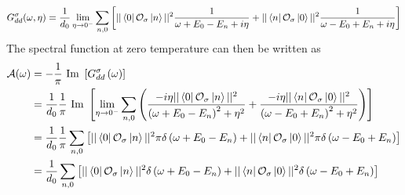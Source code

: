 \documentclass[reprint,hidelinks]{revtex4-2}
\begin{document}
\begin{widetext}
\begin{equation}\begin{aligned}
	G_{d d}^\sigma(\omega, \eta) = \frac{1}{d_0}\lim_{\eta \to 0^-}\sum_{n,0}\left[||\bra{0}\mathcal{O}_{\sigma}\ket{n}||^2\frac{1}{\omega + E_0 - E_n + i\eta} + ||\bra{n}\mathcal{O}_{\sigma}\ket{0}||^2\frac{1}{\omega - E_0 + E_n + i\eta}\right]\\
\end{aligned}\end{equation}
The spectral function at zero temperature can then be written as
\begin{equation}\begin{aligned}
	\mathcal{A(\omega)} &= -\frac{1}{\pi}\text{ Im }\left[G_{dd}^\sigma\left( \omega \right) \right] \\
			    &= \frac{1}{d_0}\frac{1}{\pi}\text{ Im }\left[\lim_{\eta \to 0^-}\sum_{n,0}\left(\frac{-i\eta ||\bra{0}\mathcal{O}_{\sigma}\ket{n}||^2}{\left(\omega + E_0 - E_n\right)^2 + \eta^2} + \frac{-i\eta ||\bra{n}\mathcal{O}_{\sigma}\ket{0}||^2}{\left(\omega - E_0 + E_n\right)^2 + \eta^2}\right)\right]\\
			    &= \frac{1}{d_0}\frac{1}{\pi}\sum_{n,0}\left[||\bra{0}\mathcal{O}_{\sigma}\ket{n}||^2\pi\delta\left(\omega + E_0 - E_n\right) + ||\bra{n}\mathcal{O}_{\sigma}\ket{0}||^2\pi\delta\left(\omega - E_0 + E_n\right)\right]\\
			    &= \frac{1}{d_0}\sum_{n,0}\left[||\bra{0}\mathcal{O}_{\sigma}\ket{n}||^2\delta\left(\omega + E_0 - E_n\right) + ||\bra{n}\mathcal{O}_{\sigma}\ket{0}||^2\delta\left(\omega - E_0 + E_n\right)\right]\\
\end{aligned}\end{equation}


\end{widetext}
\end{document}
